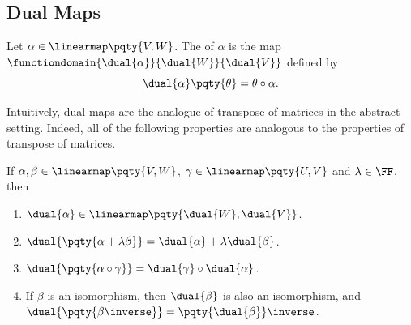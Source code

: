 \subsection{Dual Maps}

\begin{definition}
    Let \(\alpha \in \linearmap\pqty{V, W}\). The  of \(\alpha\) is the map \(\functiondomain{\dual{\alpha}}{\dual{W}}{\dual{V}}\) defined by
    \[
        \dual{\alpha} \pqty{\theta} = \theta \circ \alpha.
    \]
\end{definition}

Intuitively, dual maps are the analogue of transpose of matrices in the abstract setting. Indeed, all of the following properties are analogous to the properties of transpose of matrices.

\begin{lemma}
    If \(\alpha, \beta \in \linearmap\pqty{V, W}\), \(\gamma \in \linearmap\pqty{U, V}\) and \(\lambda \in \FF\), then
    \begin{enumerate}[label=(\roman*)]
        \item \(\dual{\alpha} \in \linearmap\pqty{\dual{W}, \dual{V}}\).
        \item \(\dual{\pqty{\alpha + \lambda\beta}} = \dual{\alpha} + \lambda \dual{\beta}\).
        \item \(\dual{\pqty{\alpha \circ \gamma}} = \dual{\gamma} \circ \dual{\alpha}\).
        \item If \(\beta\) is an isomorphism, then \(\dual{\beta}\) is also an isomorphism, and \(\dual{\pqty{\beta\inverse}} = \pqty{\dual{\beta}}\inverse\).
    \end{enumerate}
\end{lemma}

